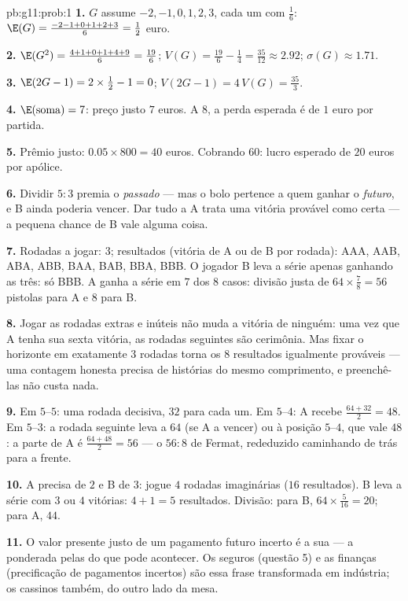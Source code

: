 \begin{solution}{pb:g11:prob:1}
\textbf{1.} $G$ assume $-2, -1, 0, 1, 2, 3$, cada um com
 $\frac16$: $\E(G) = \frac{-2 - 1 + 0 + 1 + 2 +
3}{6} = \frac12$ euro.

\textbf{2.} $\E(G^2) = \frac{4 + 1 + 0 + 1 + 4 + 9}{6} =
\frac{19}{6}$; $V(G) = \frac{19}{6} - \frac14 = \frac{35}{12}
\approx 2.92$; $\sigma(G) \approx 1.71$.

\textbf{3.} $\E(2G - 1) = 2 \times \frac12 - 1 = 0$;
$V(2G - 1) = 4\,V(G) = \frac{35}{3}$.

\textbf{4.} $\E(\text{soma}) = 7$: preço justo $7$ euros. A $8$,
a perda esperada é de $1$ euro por partida.

\textbf{5.} Prêmio justo: $0.05 \times 800 = 40$ euros. Cobrando
$60$: lucro esperado de $20$ euros por apólice.

\textbf{6.} Dividir $5:3$ premia o \emph{passado} --- mas o bolo
pertence a quem ganhar o \emph{futuro}, e B ainda poderia
vencer. Dar tudo a A trata uma vitória provável como certa ---
a pequena chance de B vale alguma coisa.

\textbf{7.} Rodadas a jogar: $3$; resultados (vitória de A ou de
B por rodada): AAA, AAB, ABA, ABB, BAA, BAB, BBA, BBB. O
jogador B leva a série apenas ganhando as três: só BBB. A ganha
a série em $7$ dos $8$ casos: divisão justa de
$64 \times \frac78 = 56$ pistolas para A e $8$ para B.

\textbf{8.} Jogar as rodadas extras e inúteis não muda a vitória
de ninguém: uma vez que A tenha sua sexta vitória, as rodadas
seguintes são cerimônia. Mas fixar o horizonte em exatamente
$3$ rodadas torna os $8$ resultados igualmente prováveis ---
uma contagem honesta precisa de histórias do mesmo comprimento,
e preenchê-las não custa nada.

\textbf{9.} Em $5$--$5$: uma rodada decisiva, $32$ para cada um.
Em $5$--$4$: A recebe $\frac{64 + 32}{2} = 48$. Em $5$--$3$: a
rodada seguinte leva a $64$ (se A a vencer) ou à posição
$5$--$4$, que vale $48$: a parte de A é
$\frac{64 + 48}{2} = 56$ --- o $56 : 8$ de Fermat, rededuzido
caminhando de trás para a frente.

\textbf{10.} A precisa de $2$ e B de $3$: jogue $4$ rodadas
imaginárias ($16$ resultados). B leva a série com $3$ ou $4$
vitórias: $4 + 1 = 5$ resultados. Divisão: para B,
$64 \times \frac{5}{16} = 20$; para A, $44$.

\textbf{11.} O valor presente justo de um pagamento futuro
incerto é a sua  --- a  ponderada pelas
 do que pode acontecer. Os seguros (questão 5) e
as finanças (precificação de pagamentos incertos) são essa
frase transformada em indústria; os cassinos também, do outro
lado da mesa.


\end{solution}
